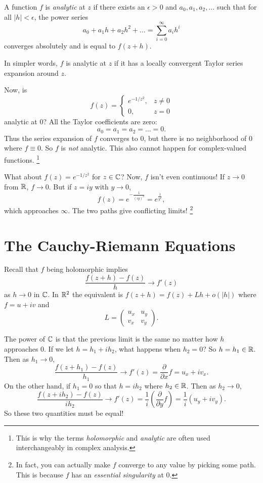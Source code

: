 \begin{tcolorbox}[title=Definition (Analytic)]
  A function $f$ is \textit{analytic} at $z$ if there
  exists an $\epsilon > 0$ and $a_0, a_1, a_2, \dots$
  such that for all $|h| < \epsilon$, the power series
  \[
  a_0 + a_1 h + a_2 h^2 + \dots
  = \sum_{i = 0}^{\infty} a_i h^i
  \] 
  converges absolutely and is equal to $f(z + h)$.
\end{tcolorbox}

In simpler words, $f$ is analytic at $z$ if it has a
locally convergent Taylor series expansion around $z$.

Now, is
\[
f(z) =
\begin{cases}
  e^{-1 / z^2}, & z \neq 0 \\
  0, & z = 0
\end{cases}
\] 
analytic at $0$? All the Taylor coefficients
are zero:
\[
  a_0 = a_1 = a_2 = \dots = 0
.\]
Thus the series expansion of $f$ converges to $0$, but
there is no neighborhood of $0$ where $f \equiv 0$.
So $f$ is \textit{not} analytic. This also cannot
happen for complex-valued functions.
\footnote{This is why the terms \textit{holomorphic} and
\textit{analytic} are often used interchangeably in
  complex analysis.}

What about $f(z) = e^{-1 / z^2}$ for $z \in \mathbb{C}$?
Now, $f$ isn't even continuous! If $z \to 0$
from $\mathbb{R}$, $f \to 0$. But if $z = iy$ with $y \to 0$,
\[f(z) = e^{-\frac{1}{(iy)^2}} = e^{\frac{1}{y^2}},\]
which approaches $\infty$. The two paths give conflicting
limits!
\footnote{In fact, you can actually make $f$ converge to
  any value by picking some path. This is because $f$
  has an \textit{essential singularity} at $0$.}

\section{The Cauchy-Riemann Equations}
Recall that $f$ being holomorphic implies
\[
  \frac{f(z + h) - f(z)}{h} \to f'(z)
\] 
as $h \to 0$ in $\mathbb{C}$. In $\mathbb{R}^2$ the equivalent is
$f(z + h) = f(z) + Lh + o(|h|)$ where $f = u + iv$ and
\[
L =
\left(\begin{matrix}
  u_x & u_y \\
  v_x & v_y
\end{matrix}\right)
.\] 

The power of $\mathbb{C}$ is that the previous limit is the same
no matter how $h$ approaches $0$. If we let
$h = h_1 + ih_2$, what happens when $h_2 = 0$? So
$h = h_1 \in \mathbb{R}$. Then as $h_1 \to 0$,
\[
  \frac{f(z + h_1) - f(z)}{h_1} \to f'(z) = \frac{\partial}{\partial x} f = u_x + iv_x
.\] 
On the other hand, if $h_1 = 0$ so that $h = ih_2$
where $h_2 \in \mathbb{R}$. Then as $h_2 \to 0$,
 \[
   \frac{f(z + ih_2) - f(z)}{ih_2} \to f'(z) = \frac{1}{i}\left(\frac{\partial}{\partial y} f\right) = \frac{1}{i} (u_y + iv_y)
.\]
So these two quantities must be equal!

